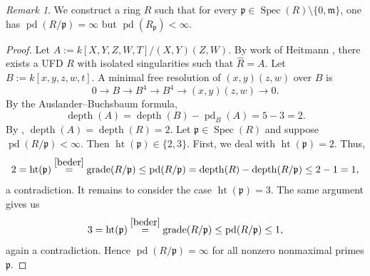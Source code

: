 \documentclass[11.05pt,a4paper]{amsart}
\theoremstyle{definition}
\theoremstyle{remark}
\newtheorem{remark}[theorem]{Remark}\newtheorem{fact}[theorem]{Fact}
\newcommand{\grade}{\operatorname{grade}}
\newcommand{\Spec}{\operatorname{Spec}}
\newcommand{\pd}{\operatorname{pd}}
\newcommand{\depth}{\operatorname{depth}}
\begin{document}
\begin{remark}
	We construct a ring $R$ such that for every $\mathfrak{p} \in\Spec(R)\setminus\{ 0, \mathfrak{m}\}$, one has $\pd(R/\mathfrak{p}) = \infty$ but $\pd(R_{\mathfrak{p}}) < \infty$.
\end{remark}

\begin{proof}
	Let $A := k[X,Y,Z,W,T]/(X,Y)(Z,W)$. By work of Heitmann \cite{hei}, there exists a UFD $R$ with isolated singularities such that $\widehat{R} = A$.
	Let $B := k[x,y,z,w,t]$. A minimal free resolution of $(x,y)(z,w)$ over $B$ is
	\[
	0 \to B \to B^4 \to B^4 \to (x,y)(z,w) \to 0.
	\]
	By the Auslander–Buchsbaum formula,
	\[
	\depth(A) = \depth(B) - \pd_B(A) = 5 - 3 = 2.
	\]
	By \cite[Ex.~1.2.26]{BH}, $\depth(A) = \depth(R) = 2$.
	Let $\mathfrak{p} \in \Spec(R)$ and suppose $\pd(R/\mathfrak{p}) < \infty$. Then $\operatorname{ht}(\mathfrak{p}) \in \{2,3\}$.
First, we deal with $\operatorname{ht}(\mathfrak{p}) = 2$. Thus,
	\[
	2 = \operatorname{ht}(\mathfrak{p}) \stackrel{\ref{beder}}= \grade(R/\mathfrak{p})
	\leq \pd(R/\mathfrak{p}) = \depth(R) - \depth(R/\mathfrak{p}) \leq 2 - 1 = 1,
	\]
	a contradiction.
It remains to consider the case $\operatorname{ht}(\mathfrak{p}) = 3$. The same argument gives us
	\[
	3 = \operatorname{ht}(\mathfrak{p}) \stackrel{\ref{beder}}= \grade(R/\mathfrak{p})
	\leq \pd(R/\mathfrak{p}) \leq 1,
	\]
	again a contradiction. Hence $\pd(R/\mathfrak{p}) = \infty$ for all nonzero nonmaximal primes $\mathfrak{p}$.
\end{proof}
\medskip
\end{document}
